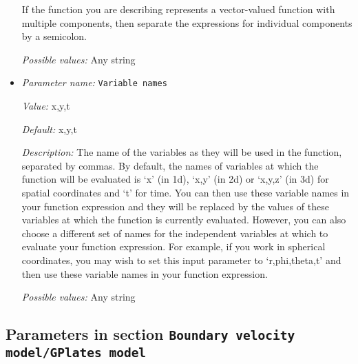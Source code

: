 \begin{itemize}
If the function you are describing represents a vector-valued function with multiple components, then separate the expressions for individual components by a semicolon.


{\it Possible values:} Any string
\item {\it Parameter name:} {\tt Variable names}
\label{parameters:Boundary velocity model/Function/Variable names}


{\it Value:} x,y,t


{\it Default:} x,y,t


{\it Description:} The name of the variables as they will be used in the function, separated by commas. By default, the names of variables at which the function will be evaluated is `x' (in 1d), `x,y' (in 2d) or `x,y,z' (in 3d) for spatial coordinates and `t' for time. You can then use these variable names in your function expression and they will be replaced by the values of these variables at which the function is currently evaluated. However, you can also choose a different set of names for the independent variables at which to evaluate your function expression. For example, if you work in spherical coordinates, you may wish to set this input parameter to `r,phi,theta,t' and then use these variable names in your function expression.


{\it Possible values:} Any string
\end{itemize}

\subsection{Parameters in section \tt Boundary velocity model/GPlates model}
\label{parameters:Boundary_20velocity_20model/GPlates_20model}

